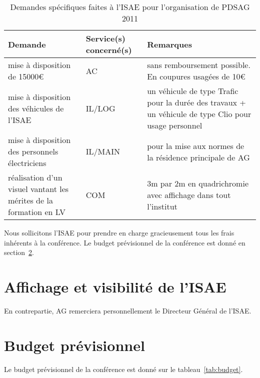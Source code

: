 \documentclass[fr]{supaero-orga}
\def\EUR{{\euro}}
\begin{document}
\begin{table}[h]
  \centering
  \begin{tabular}[h]{p{} l p{}}
    \toprule[1.5pt]
    \textbf{Demande} & \textbf{Service(s) concerné(s)} & \textbf{Remarques}\\
    \midrule
    mise à disposition de 15000\EUR & AC & sans remboursement
    possible. En coupures usagées de 10\EUR\\

    mise à disposition des véhicules de l'ISAE & IL/LOG & un véhicule
    de type Trafic pour la durée des travaux + un véhicule de type
    Clio pour usage personnel \\
    
    mise à disposition des personnels électriciens &
    IL/MAIN & pour la mise aux normes de la résidence principale de AG\\

    réalisation d'un visuel vantant les mérites de la formation en LV
    & COM 
    & 3m par 2m en quadrichromie avec affichage dans tout l'institut\\
    \bottomrule[1.5pt]
  \end{tabular}
  \caption{Demandes spécifiques faites à l'ISAE pour l'organisation
    de PDSAG 2011}
  \label{tab:demandes}
\end{table}

Nous sollicitons l'ISAE pour prendre en charge gracieusement tous les
frais inhérents à la conférence. Le budget prévisionnel de la
conférence est donné en section~\ref{sec:budget-previsionnel}.

\section{Affichage et visibilité de l'ISAE}
\label{sec:affich-et-visib}

En contrepartie, AG remerciera personnellement le Directeur Général de
l'ISAE.

\section{Budget prévisionnel}
\label{sec:budget-previsionnel}

Le budget prévisionnel de la conférence est donné sur le
tableau~\ref{tab:budget}.
\end{document}
